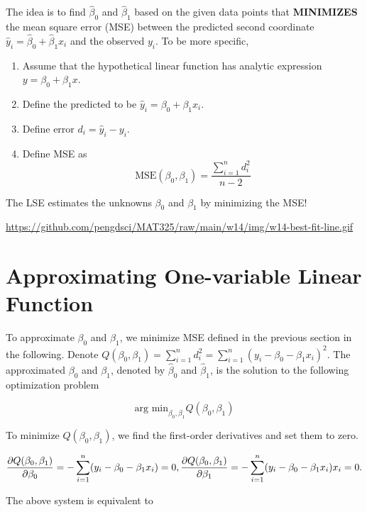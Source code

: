 \documentclass[
]{book}
\begin{document}
The idea is to find \(\hat{\beta}_0\) and \(\hat{\beta}_1\) based on the given data points that \textbf{MINIMIZES} the mean square error (MSE) between the predicted second coordinate \(\hat{y}_i = \hat{\beta}_0 + \hat{\beta}_1 x_i\) and the observed \(y_i\). To be more specific,

\begin{enumerate}
\def\labelenumi{\arabic{enumi}.}
\item
  Assume that the hypothetical linear function has analytic expression \(y = \beta_0 + \beta_1 x\).
\item
  Define the predicted to be \(\hat{y}_i = \beta_0 + \beta_1 x_i\).
\item
  Define error \(d_i = \hat{y}_i - y_i\).
\item
  Define MSE as
  \[
  \text{MSE}(\beta_0, \beta_1) = \frac{\sum_{i=1}^n d_i^2}{n-2}
  \]
\end{enumerate}

The LSE estimates the unknowns \(\beta_0\) and \(\beta_1\) by minimizing the MSE!

\url{https://github.com/pengdsci/MAT325/raw/main/w14/img/w14-best-fit-line.gif}

\hfill\break

\hypertarget{approximating-one-variable-linear-function}{%
\section{Approximating One-variable Linear Function}\label{approximating-one-variable-linear-function}}

To approximate \(\beta_0\) and \(\beta_1\), we minimize MSE defined in the previous section in the following. Denote \(Q(\beta_0, \beta_1) = \sum_{i =1}^n d_i^2 = \sum_{i =1}^n (y_i - \beta_0 - \beta_1 x_i )^2\). The approximated \(\beta_0\) and \(\beta_1\), denoted by \(\hat{\beta}_0\) and \(\hat{\beta}_1\), is the solution to the following optimization problem

\[
\text{arg min}_{\beta_0, \beta_1} Q(\beta_0, \beta_1)
\]

To minimize \(Q(\beta_0, \beta_1)\), we find the first-order derivatives and set them to zero.

\[
\frac{\partial Q(\beta_0, \beta_1)}{\partial \beta_0} = -\sum_{i=1}^n (y_i-\beta_0 - \beta_1 x_i) =0,\\
\frac{\partial Q(\beta_0, \beta_1)}{\partial \beta_1} = -\sum_{i=1}^n (y_i-\beta_0 - \beta_1 x_i)x_i=0.
\]

The above system is equivalent to
\end{document}
